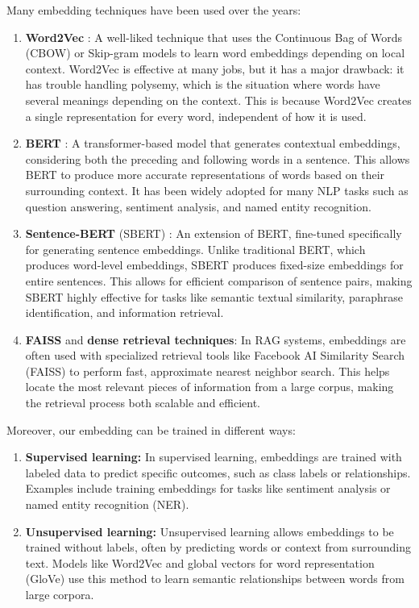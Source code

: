 Many embedding techniques have been used over the years:
\begin{enumerate}
    \item \textbf{Word2Vec} \cite{mikolov2013efficient}: A well-liked technique that uses the Continuous Bag of Words (CBOW) or Skip-gram models to learn word embeddings depending on local context. Word2Vec is effective at many jobs, but it has a major drawback: it has trouble handling polysemy, which is the situation where words have several meanings depending on the context. This is because Word2Vec creates a single representation for every word, independent of how it is used.

    \item \textbf{BERT} \cite{devlin2019bert}: A transformer-based model that generates contextual embeddings, considering both the preceding and following words in a sentence. This allows BERT to produce more accurate representations of words based on their surrounding context. It has been widely adopted for many NLP tasks such as question answering, sentiment analysis, and named entity recognition.

    \item \textbf{Sentence-BERT} (SBERT) \cite{reimers-2019-sentence-bert}: An extension of BERT, fine-tuned specifically for generating sentence embeddings. Unlike traditional BERT, which produces word-level embeddings, SBERT produces fixed-size embeddings for entire sentences. This allows for efficient comparison of sentence pairs, making SBERT highly effective for tasks like semantic textual similarity, paraphrase identification, and information retrieval.

    \item \textbf{FAISS} \cite{douze2024faiss} and \textbf{dense retrieval techniques}: In RAG systems, embeddings are often used with specialized retrieval tools like Facebook AI Similarity Search (FAISS) to perform fast, approximate nearest neighbor search. This helps locate the most relevant pieces of information from a large corpus, making the retrieval process both scalable and efficient.
\end{enumerate}


Moreover, our embedding can be trained in different ways: 
\begin{enumerate}
    \item \textbf{Supervised learning:} In supervised learning, embeddings are trained with labeled data to predict specific outcomes, such as class labels or relationships. Examples include training embeddings for tasks like sentiment analysis or named entity recognition (NER).
    \item \textbf{Unsupervised learning:} Unsupervised learning allows embeddings to be trained without labels, often by predicting words or context from surrounding text. Models like Word2Vec and global vectors for word representation (GloVe) \cite{Pennington2014GloVeGV} use this method to learn semantic relationships between words from large corpora.
   
\end{enumerate}

